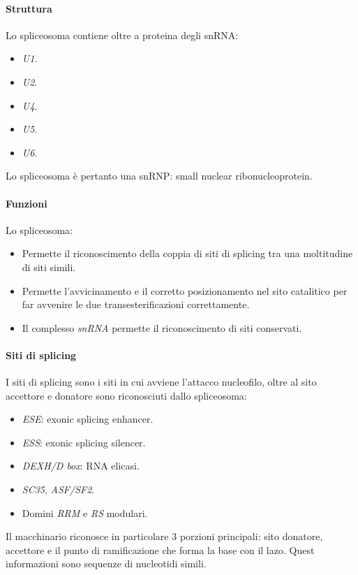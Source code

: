 			\paragraph{Struttura}
			Lo spliceosoma contiene oltre a proteina degli snRNA:
			\begin{multicols}{5}
				\begin{itemize}
					\item \emph{U1}.
					\item \emph{U2}.
					\item \emph{U4}.
					\item \emph{U5}.
					\item \emph{U6}.
				\end{itemize}
			\end{multicols}
			Lo spliceosoma \`e pertanto una snRNP: small nuclear ribonucleoprotein.

			\paragraph{Funzioni}
			Lo spliceosoma:
			\begin{multicols}{2}
				\begin{itemize}
					\item Permette il riconoscimento della coppia di siti di splicing tra una moltitudine di siti simili.
					\item Permette l'avvicinamento e il corretto posizionamento nel sito catalitico per far avvenire le due transesterificazioni correttamente.
					\item Il complesso \emph{snRNA} permette il riconoscimento di siti conservati.
				\end{itemize}
			\end{multicols}

			\paragraph{Siti di splicing}
			I siti di splicing sono i siti in cui avviene l'attacco nucleofilo, oltre al sito accettore e donatore sono riconosciuti dallo spliceosoma:
			\begin{multicols}{3}
				\begin{itemize}
					\item \emph{ESE}: exonic splicing enhancer.
					\item \emph{ESS}: exonic splicing silencer.
					\item \emph{DEXH/D box}: RNA elicasi.
					\item \emph{SC35}, \emph{ASF/SF2}.
					\item Domini \emph{RRM} e \emph{RS} modulari.
				\end{itemize}
			\end{multicols}
			Il macchinario riconosce in particolare $3$ porzioni principali: sito donatore, accettore e il punto di ramificazione che forma la base con il lazo.
			Quest informazioni sono sequenze di nucleotidi simili.

